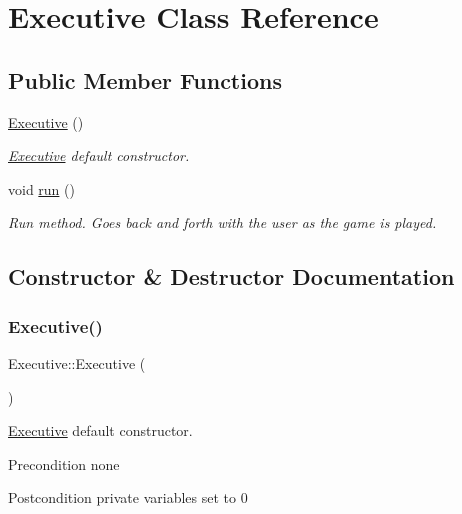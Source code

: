 \hypertarget{class_executive}{}\section{Executive Class Reference}
\label{class_executive}
\subsection*{Public Member Functions}
\begin{DoxyCompactItemize}
\item 
\mbox{\hyperlink{class_executive_ad870c1d741f1f313eb0c5a8336f8af6b}{Executive}} ()
\begin{DoxyCompactList}\small\item\em \mbox{\hyperlink{class_executive}{Executive}} default constructor. \end{DoxyCompactList}\item 
void \mbox{\hyperlink{class_executive_adef7cad3387e8fc79d92ffd418f45258}{run}} ()
\begin{DoxyCompactList}\small\item\em Run method. Goes back and forth with the user as the game is played. \end{DoxyCompactList}\end{DoxyCompactItemize}


\subsection{Constructor \& Destructor Documentation}
\mbox{\label{class_executive_ad870c1d741f1f313eb0c5a8336f8af6b}} 
\subsubsection{\texorpdfstring{Executive()}{Executive()}}
{\footnotesize\ttfamily Executive\+::\+Executive (\begin{DoxyParamCaption}{ }\end{DoxyParamCaption})}



\mbox{\hyperlink{class_executive}{Executive}} default constructor. 

\begin{DoxyPrecond}{Precondition}
none 
\end{DoxyPrecond}
\begin{DoxyPostcond}{Postcondition}
private variables set to 0 
\end{DoxyPostcond}



